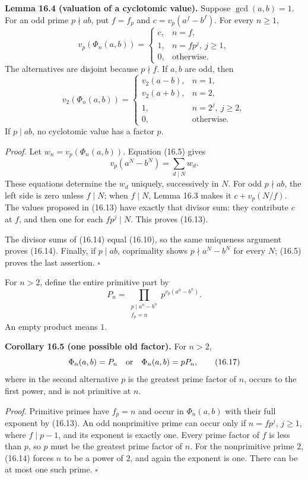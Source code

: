 \documentclass[
  11pt,
  a4paper,
]{article}
\begin{document}
\textbf{Lemma 16.4 (valuation of a cyclotomic value).} Suppose
\(\gcd(a,b)=1\). For an odd prime \(p\nmid ab\), put \(f=f_p\) and
\(c=v_p(a^f-b^f)\). For every \(n\geq1\), \[
 v_p(\Phi_n(a,b))=
 \begin{cases}
 c,&n=f,\\
 1,&n=fp^j,\ j\geq1,\\
 0,&\text{otherwise}.
 \end{cases}
 \tag{16.13}
\] The alternatives are disjoint because \(p\nmid f\). If \(a,b\) are
odd, then \[
 v_2(\Phi_n(a,b))=
 \begin{cases}
 v_2(a-b),&n=1,\\
 v_2(a+b),&n=2,\\
 1,&n=2^j,\ j\geq2,\\
 0,&\text{otherwise}.
 \end{cases}
 \tag{16.14}
\] If \(p\mid ab\), no cyclotomic value has a factor \(p\).

\emph{Proof.} Let \(w_n=v_p(\Phi_n(a,b))\). Equation (16.5) gives \[
 v_p(a^N-b^N)=\sum_{d\mid N}w_d.
 \tag{16.15}
\] These equations determine the \(w_d\) uniquely, successively in
\(N\). For odd \(p\nmid ab\), the left side is zero unless \(f\mid N\);
when \(f\mid N\), Lemma 16.3 makes it \(c+v_p(N/f)\). The values
proposed in (16.13) have exactly that divisor sum: they contribute \(c\)
at \(f\), and then one for each \(fp^j\mid N\). This proves (16.13).

The divisor sums of (16.14) equal (16.10), so the same uniqueness
argument proves (16.14). Finally, if \(p\mid ab\), coprimality shows
\(p\nmid a^N-b^N\) for every \(N\); (16.5) proves the last assertion.
\(\square\)

For \(n>2\), define the entire primitive part by \[
 P_n=\prod_{\substack{p\mid a^n-b^n\\f_p=n}}
                    p^{v_p(a^n-b^n)}.
 \tag{16.16}
\] An empty product means \(1\).

\textbf{Corollary 16.5 (one possible old factor).} For \(n>2\), \[
 \Phi_n(a,b)=P_n\quad\hbox{or}\quad \Phi_n(a,b)=pP_n,
 \tag{16.17}
\] where in the second alternative \(p\) is the greatest prime factor of
\(n\), occurs to the first power, and is not primitive at \(n\).

\emph{Proof.} Primitive primes have \(f_p=n\) and occur in
\(\Phi_n(a,b)\) with their full exponent by (16.13). An odd nonprimitive
prime can occur only if \(n=fp^j\), \(j\geq1\), where \(f\mid p-1\), and
its exponent is exactly one. Every prime factor of \(f\) is less than
\(p\), so \(p\) must be the greatest prime factor of \(n\). For the
nonprimitive prime \(2\), (16.14) forces \(n\) to be a power of \(2\),
and again the exponent is one. There can be at most one such prime.
\(\square\)
\end{document}
